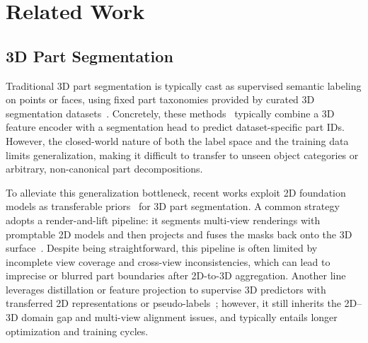 \section{Related Work}

\subsection{3D Part Segmentation}
Traditional 3D part segmentation is typically cast as supervised semantic labeling on points or faces, using fixed part taxonomies provided by curated 3D segmentation datasets~\cite{partnet,3dmeshsegmentation,scannet,pointnet}.
%
Concretely, these methods~\cite{pointnet,pointtransformerv2,pointtransformerv3,pointpromptraining,meshcnn,meshtransformer} typically combine a 3D feature encoder with a segmentation head to predict dataset-specific part IDs.
%
However, the closed-world nature of both the label space and the training data limits generalization, making it difficult to transfer to unseen object categories or arbitrary, non-canonical part decompositions.


To alleviate this generalization bottleneck, recent works exploit 2D foundation models as transferable priors~\cite{clip,glip,sam,sam2,dino,dinov2} for 3D part segmentation.
%
A common strategy adopts a render-and-lift pipeline: it segments multi-view renderings with promptable 2D models and then projects and fuses the masks back onto the 3D surface~\cite{segmentanymesh,sam3d,sampro3d,partslip++,zerops}.
%
Despite being straightforward, this pipeline is often limited by incomplete view coverage and cross-view inconsistencies, which can lead to imprecise or blurred part boundaries after 2D-to-3D aggregation. 
%
Another line leverages distillation or feature projection to supervise 3D predictors with transferred 2D representations or pseudo-labels~\cite{partdistill,3dpartsegvia2dfea}; 
%
however, it still inherits the 2D--3D domain gap and multi-view alignment issues, and typically entails longer optimization and training cycles.


